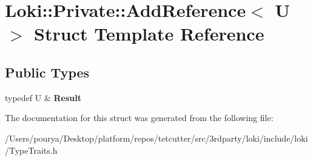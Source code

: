 \hypertarget{structLoki_1_1Private_1_1AddReference}{}\section{Loki\+:\+:Private\+:\+:Add\+Reference$<$ U $>$ Struct Template Reference}
\label{structLoki_1_1Private_1_1AddReference}
\subsection*{Public Types}
\begin{DoxyCompactItemize}
\item 
\hypertarget{structLoki_1_1Private_1_1AddReference_adf805d7b9363ba34b479495f0599931c}{}typedef U \& {\bfseries Result}\label{structLoki_1_1Private_1_1AddReference_adf805d7b9363ba34b479495f0599931c}

\end{DoxyCompactItemize}


The documentation for this struct was generated from the following file\+:\begin{DoxyCompactItemize}
\item 
/\+Users/pourya/\+Desktop/platform/repos/tetcutter/src/3rdparty/loki/include/loki/Type\+Traits.\+h\end{DoxyCompactItemize}
